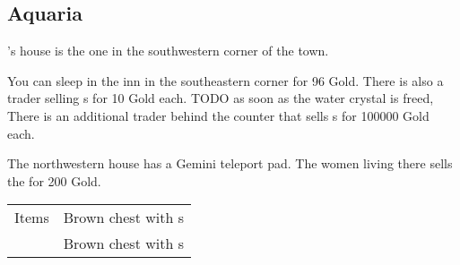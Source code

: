 \subsection{Aquaria}
\label{map:aquaria}

's house is the one in the southwestern corner of the town. 

You can sleep in the inn in the southeastern corner for 96 Gold. There is also a trader selling s for 10 Gold each. TODO as soon as the water crystal is freed, There is an additional trader behind the counter that sells s for 100000 Gold each.

The northwestern house has a Gemini teleport pad. The women living there sells the  for 200 Gold.

\begin{longtable}{ l p{9cm} }
	Items & Brown chest with \nameref{item:heal_potion}s \\
	& Brown chest with \nameref{item:refresher}s
\end{longtable}

